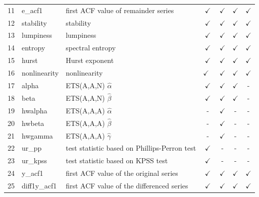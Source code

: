 \documentclass[11pt,a4paper,]{article}
\def\yes{$\checkmark$}
\begin{document}
\begin{table}[!htp]
\begin{tabular}{llp{}cccc}
11  & e\_acf1        & first ACF value of remainder series                                                     & \yes  & \yes & \yes & \yes\\
12  & stability      & stability                                                                               & \yes  & \yes & \yes & \yes\\
13  & lumpiness      & lumpiness                                                                               & \yes  & \yes & \yes & \yes\\
14 & entropy        & spectral entropy                                                                        & \yes  & \yes & \yes & \yes\\
15 & hurst          & Hurst exponent                                                                          & \yes  & \yes & \yes & \yes\\
16 & nonlinearity   & nonlinearity                                                                            & \yes\ & \yes & \yes & \yes\\
17 & alpha          & ETS(A,A,N) $\hat\alpha$                                                                 & \yes  & \yes & \yes & -\\
18 & beta           & ETS(A,A,N) $\hat\beta$                                                                  & \yes  & \yes & \yes & - \\
19 & hwalpha        & ETS(A,A,A) $\hat\alpha$                                                                 & -     & \yes & - & -\\
20 & hwbeta         & ETS(A,A,A) $\hat\beta$                                                                  & -     & \yes & - & - \\
21 & hwgamma        & ETS(A,A,A) $\hat\gamma$                                                                 & -     & \yes & - &-\\
22 & ur\_pp         & test statistic based on Phillips-Perron test                                            & \yes  & - & - & - \\
23 & ur\_kpss       & test statistic based on KPSS test                                                       & \yes  & - & - & - \\
24 & y\_acf1        & first ACF value of the original series                                                  & \yes  & \yes & \yes & \yes\\
25 & diff1y\_acf1   & first ACF value of the differenced series                                               & \yes  & \yes & \yes & \yes\\

\end{tabular}
\end{table}
\end{document}
